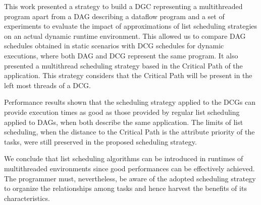 \documentclass[twocolumn]{svjour3}
\begin{document}
This work presented a strategy to build a DGC representing a multithreaded program apart from a DAG describing a dataflow program and a set of experiments to evaluate the impact of approximations of list scheduling strategies on an actual dynamic runtime environment. This allowed us to compare DAG schedules obtained in static scenarios with DCG schedules for dynamic executions, where both DAG and DCG represent the same program. It also presented a multithread scheduling strategy based in the Critical Path of the application. This strategy considers that the Critical Path will be present in the left most threads of a DCG. 

Performance results shown that the scheduling strategy applied to the DCGs can provide execution times as good as those provided by regular list scheduling applied to DAGs, when both describe the same application. The limits of list scheduling, when the distance to the Critical Path is the attribute priority of the tasks, were still preserved in the proposed scheduling strategy.

We conclude that list scheduling algorithms can be introduced in runtimes of multithreaded environments since good performances can be effectively achieved. The programmer must, nevertheless, be aware of the adopted scheduling strategy to organize the relationships among tasks and hence harvest the benefits of its characteristics.



\end{document}
